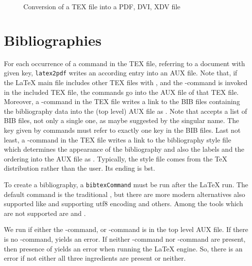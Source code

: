 \begin{figure}[htb]
\centering
{}
\caption{\label{fig:tex2pdf}Conversion of a TEX file into a PDF, DVI, XDV file }
\end{figure}

\section{Bibliographies}\label{sec:bibtex}


For each occurrence of a command  in the TEX file, 
referring to a document with given key,
\texttt{latex2pdf} writes an according entry  
into an AUX file. 
Note that, 
if the \LaTeX{} main file includes other TEX files with , 
and the -command is invoked in the included TEX file, 
the  commands go into the AUX file of that TEX file. 
Moreover, a -command in the TEX file 
writes a link to the BIB files containing the bibliography data 
into the (top level) AUX file as . 
Note that  accepts a list of BIB files, not only a single one, 
as maybe suggested by the singular name. 
The key given by  commands must refer to exactly one key in the BIB files. 
Last not least, a -command in the TEX file 
writes a link to the bibliography style file 
which determines the appearance of the bibliography 
and also the labels and the ordering 
into the AUX file as . 
Typically, the style file comes from the \TeX{} distribution rather than the user. 
Its ending is \gls{bst}. 

To create a bibliography, 
a \texttt{bibtexCommand} must be run after the \LaTeX{} run. 
The default command is the traditional , 
but there are more modern alternatives also supported
like  and  supporting utf8 encoding 
and others. 
Among the tools which are not supported are  and . 

We run  if either 
the -command, or -command 
is in the top level AUX file. 
If there is no -command,  yields an error. 
If neither -command nor -command 
are present, then presence of  yields an error when running the \LaTeX{} engine. 
So, there is an error if not either all three ingredients are present or neither. 


